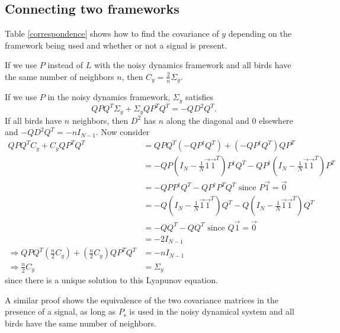 \documentclass{article}
\begin{document}
\subsection{Connecting two frameworks }
Table \ref{correspondence} shows how to find the covariance of $y$ depending on the framework being used and whether or not a signal is present. 
\begin{claim}\label{cov_equivalence}If we use $P$ instead of $L$ with the noisy dynamics framework and all birds have the same number of neighbors $n$, then $C_y=\frac{2}{n}\Sigma_y$.
\end{claim}
\begin{pf}
If we use $P$ in the noisy dynamics framework, $\Sigma_y$ satisfies
\begin{equation}
QPQ^T\Sigma_y+\Sigma_y QP^TQ^T=-QD^2Q^T.
\end{equation}
If all birds have $n$ neighbors, then $D^2$ has $n$ along the diagonal and $0$ elsewhere and $-QD^2Q^T=-nI_{N-1}$.  Now consider
\begin{align*}
QPQ^TC_y+C_yQP^TQ^T&=QPQ^T(-QP^\dagger Q^T)+(-QP^\dagger Q^T)QP^T
\\&=-QP(I_N-\frac{1}{N}\vec{1}\vec{1}^T)P^\dagger Q^T-QP^\dagger (I_N-\frac{1}{N}\vec{1}\vec{1}^T)P^T
\\&=-QPP^\dagger Q^T-QP^\dagger P^TQ^T \text{ since $P\vec{1}=\vec{0}$ }
\\&=-Q(I_N-\frac{1}{N}\vec{1}\vec{1}^T)Q^T-Q(I_N-\frac{1}{N}\vec{1}\vec{1}^T)Q^T
\\&=-QQ^T-QQ^T \text{ since $Q\vec{1}=\vec{0}$}
\\&=-2I_{N-1}
\\ \Rightarrow QPQ^T\left(\frac{n}{2}C_y\right)+\left(\frac{n}{2}C_y\right)QP^TQ^T&=-nI_{N-1}
\\ \Rightarrow\frac{n}{2}C_y&=\Sigma_y
\end{align*}
since there is a unique solution to this Lyapunov equation.
\end{pf}
A similar proof shows the equivalence of the two covariance matrices in the presence of a signal, as long as $P_\text{s}$ is used in the noisy dynamical system and all birds have the same number of neighbors.
%
%
\end{document}
